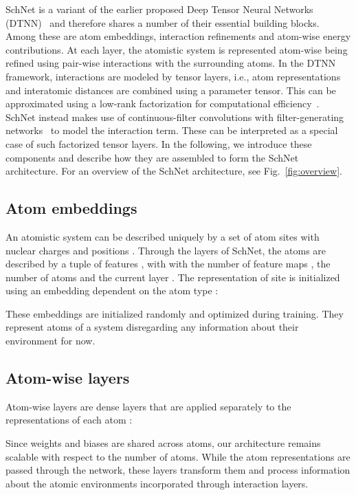 \documentclass[aip,jcp,reprint,graphicx]{revtex4-1}
\newcommand{\new}[1]{#1}
\begin{document}
SchNet is a variant of the earlier proposed Deep Tensor Neural Networks (DTNN)~\citep{schutt2017quantum} and therefore shares a number of their essential building blocks.
Among these are atom embeddings, interaction refinements and atom-wise energy contributions.
At each layer, the atomistic system is represented atom-wise being refined using pair-wise interactions with the surrounding atoms.
\new{In the DTNN framework, interactions are modeled by tensor layers, i.e., atom representations and interatomic distances are combined using a parameter tensor. This can be approximated using a low-rank factorization for computational efficiency~\citep{Taylor2009a,yu2013deep,socher2013recursive}.
SchNet instead makes use of continuous-filter convolutions with filter-generating networks~\citep{BrabandereJTG16,schutt2017schnet} to model the interaction term.}
These can be interpreted as a special case of such factorized tensor layers.
In the following, we introduce these components and describe how they are assembled to form the SchNet architecture.
For an overview of the SchNet architecture, see Fig.~\ref{fig:overview}.

\subsection{Atom embeddings}

An atomistic system can be described uniquely by a set of  atom sites with nuclear charges  and positions .
Through the layers of SchNet, the atoms are described by a tuple of features , with  with the number of feature maps , the number of atoms  and the current layer .
The representation of site  is initialized using an embedding dependent on the atom type :

These embeddings  are initialized randomly and optimized during training.
They represent atoms of a system disregarding any information about their environment for now.

\subsection{Atom-wise layers}
Atom-wise layers are dense layers that are applied separately to the representations  of each atom :

Since weights  and biases  are shared across atoms, our architecture remains scalable with respect to the number of atoms.
While the atom representations are passed through the network, these layers transform them and process information about the atomic environments incorporated through interaction layers.
\end{document}
